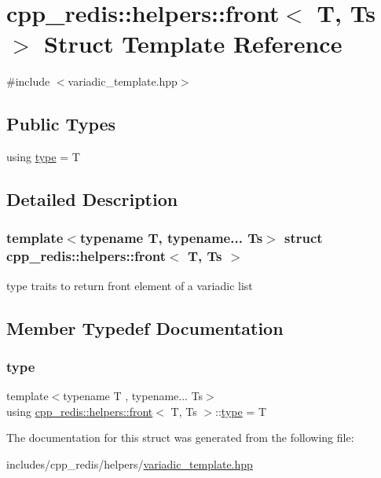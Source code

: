 \hypertarget{structcpp__redis_1_1helpers_1_1front}{}\section{cpp\+\_\+redis\+:\+:helpers\+:\+:front$<$ T, Ts $>$ Struct Template Reference}
\label{structcpp__redis_1_1helpers_1_1front}


{\ttfamily \#include $<$variadic\+\_\+template.\+hpp$>$}

\subsection*{Public Types}
\begin{DoxyCompactItemize}
\item 
using \hyperlink{structcpp__redis_1_1helpers_1_1front_a23178392c9417cc5ada75205931d1768}{type} = T
\end{DoxyCompactItemize}


\subsection{Detailed Description}
\subsubsection*{template$<$typename T, typename... Ts$>$\newline
struct cpp\+\_\+redis\+::helpers\+::front$<$ T, Ts $>$}

type traits to return front element of a variadic list 

\subsection{Member Typedef Documentation}
\mbox{\label{structcpp__redis_1_1helpers_1_1front_a23178392c9417cc5ada75205931d1768}} 
\subsubsection{\texorpdfstring{type}{type}}
{\footnotesize\ttfamily template$<$typename T , typename... Ts$>$ \\
using \hyperlink{structcpp__redis_1_1helpers_1_1front}{cpp\+\_\+redis\+::helpers\+::front}$<$ T, Ts $>$\+::\hyperlink{structcpp__redis_1_1helpers_1_1front_a23178392c9417cc5ada75205931d1768}{type} =  T}



The documentation for this struct was generated from the following file\+:\begin{DoxyCompactItemize}
\item 
includes/cpp\+\_\+redis/helpers/\hyperlink{variadic__template_8hpp}{variadic\+\_\+template.\+hpp}\end{DoxyCompactItemize}
